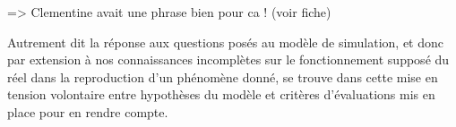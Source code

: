 













=> Clementine avait une phrase bien pour ca ! (voir fiche)

Autrement dit la réponse aux questions posés au modèle de simulation, et donc par extension à nos connaissances incomplètes sur le fonctionnement supposé du réel dans la reproduction d'un phénomène donné, se trouve dans cette mise en tension volontaire entre hypothèses du modèle et critères d'évaluations mis en place pour en rendre compte.

